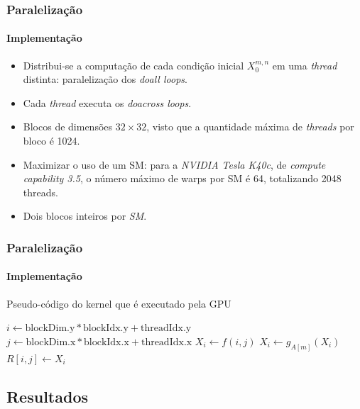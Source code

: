 \documentclass[10pt]{beamer}
\begin{document}
\begin{frame}
\frametitle{Paralelização}
\framesubtitle{Implementação}
\begin{itemize}
  \item Distribui-se a computação de cada condição inicial \(X_0^{m,n}\) em uma
  \textit{thread} distinta: paralelização dos \textit{doall loops}.
  \item Cada \textit{thread} executa os \textit{doacross loops}.
  \item  Blocos de dimensões \(32\times32\), visto que a quantidade máxima
  de \textit{threads} por bloco é 1024.
  \item Maximizar o uso de um SM: para a \textit{NVIDIA Tesla K40c}, de
  \textit{compute capability 3.5}, o número máximo de warps por SM é 64,
  totalizando 2048 threads.
  \item Dois blocos inteiros por \textit{SM}.
\end{itemize}

\end{frame}

\begin{frame}
\frametitle{Paralelização}
\framesubtitle{Implementação}

\begin{algorithm}[H]
\caption{Pseudo-código do kernel que é executado pela GPU} 
\begin{algorithmic}[1]
  	\State ${i} \gets \text{blockDim.y} * \text{blockIdx.y} + \text{threadIdx.y} $  
  	\State ${j} \gets \text{blockDim.x} * \text{blockIdx.x} + \text{threadIdx.x} $   
    \State ${X_i} \gets f(i,j) $ 
     
         
        	\State $X_i \gets g_{A[m]} (X_i)$ 
    	\EndFor
    \EndFor
    \State ${R[i,j]} \gets X_i $ 
   \EndFunction
\end{algorithmic}
\end{algorithm}

\end{frame}

\subsection{Resultados}
\end{document}
